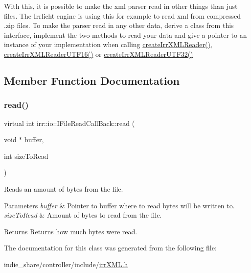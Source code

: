 With this, it is possible to make the xml parser read in other things than just files. The Irrlicht engine is using this for example to read xml from compressed .zip files. To make the parser read in any other data, derive a class from this interface, implement the two methods to read your data and give a pointer to an instance of your implementation when calling \hyperlink{namespaceirr_1_1io_a581f4d4648398759c61266d63d7106b1}{create\+Irr\+X\+M\+L\+Reader()}, \hyperlink{namespaceirr_1_1io_a86473ef152c15b685af181a4c5461a5d}{create\+Irr\+X\+M\+L\+Reader\+U\+T\+F16()} or \hyperlink{namespaceirr_1_1io_ae05bf7ee342431ea8c98fb98e75b974a}{create\+Irr\+X\+M\+L\+Reader\+U\+T\+F32()} 

\subsection{Member Function Documentation}
\mbox{\label{classirr_1_1io_1_1IFileReadCallBack_ae8c57b8454078aa2acd39772a6aa4439}} 
\subsubsection{\texorpdfstring{read()}{read()}}
{\footnotesize\ttfamily virtual int irr\+::io\+::\+I\+File\+Read\+Call\+Back\+::read (\begin{DoxyParamCaption}\item[{void $\ast$}]{buffer,  }\item[{int}]{size\+To\+Read }\end{DoxyParamCaption})\hspace{0.3cm}{\ttfamily [pure virtual]}}



Reads an amount of bytes from the file. 


\begin{DoxyParams}{Parameters}
{\em buffer} & Pointer to buffer where to read bytes will be written to. \\
\hline
{\em size\+To\+Read} & Amount of bytes to read from the file. \\
\hline
\end{DoxyParams}
\begin{DoxyReturn}{Returns}
Returns how much bytes were read. 
\end{DoxyReturn}


The documentation for this class was generated from the following file\+:\begin{DoxyCompactItemize}
\item 
indie\+\_\+share/controller/include/\hyperlink{irrXML_8h}{irr\+X\+M\+L.\+h}\end{DoxyCompactItemize}

